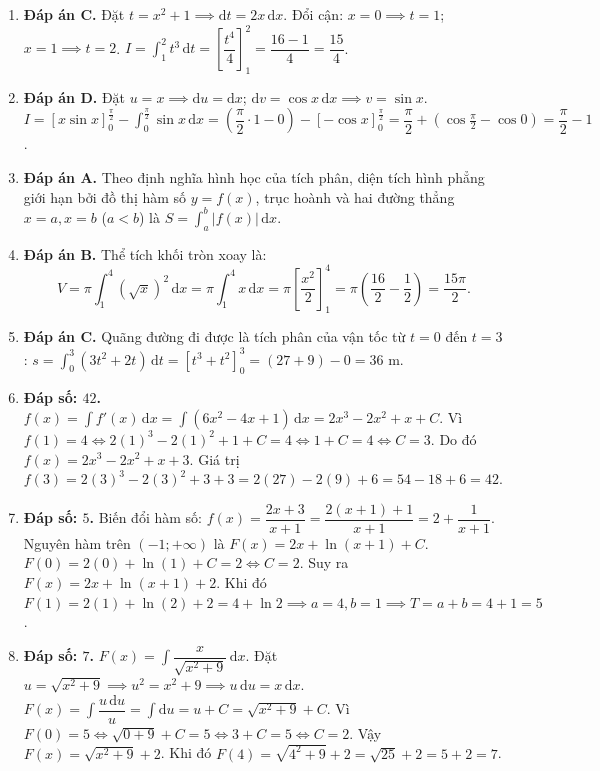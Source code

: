 \documentclass[12pt,a4paper]{article}
\begin{document}
\begin{enumerate}[start=16]
\item \textbf{Đáp án C.}  
Đặt $t = x^2+1 \implies \mathrm{d}t = 2x\,\mathrm{d}x$.  
Đổi cận: $x = 0 \implies t = 1$; $x = 1 \implies t = 2$.  
$I = \int_1^2 t^3\,\mathrm{d}t = \left[ \dfrac{t^4}{4} \right]_1^2 = \dfrac{16 - 1}{4} = \dfrac{15}{4}$.

\item \textbf{Đáp án D.}  
Đặt $u = x \implies \mathrm{d}u = \mathrm{d}x$; $\mathrm{d}v = \cos x\,\mathrm{d}x \implies v = \sin x$.  
$I = [x\sin x]_0^{\frac{\pi}{2}} - \int_0^{\frac{\pi}{2}} \sin x\,\mathrm{d}x = \left(\dfrac{\pi}{2} \cdot 1 - 0\right) - [-\cos x]_0^{\frac{\pi}{2}} = \dfrac{\pi}{2} + (\cos \frac{\pi}{2} - \cos 0) = \dfrac{\pi}{2} - 1$.

\item \textbf{Đáp án A.}  
Theo định nghĩa hình học của tích phân, diện tích hình phẳng giới hạn bởi đồ thị hàm số $y = f(x)$, trục hoành và hai đường thẳng $x = a, x = b$ ($a < b$) là $S = \int_a^b |f(x)|\,\mathrm{d}x$.

\item \textbf{Đáp án B.}  
Thể tích khối tròn xoay là:  
\[
V = \pi \int_1^4 (\sqrt{x})^2\,\mathrm{d}x = \pi \int_1^4 x\,\mathrm{d}x = \pi \left[ \dfrac{x^2}{2} \right]_1^4 = \pi \left(\dfrac{16}{2} - \dfrac{1}{2}\right) = \dfrac{15\pi}{2}.
\]

\item \textbf{Đáp án C.}  
Quãng đường đi được là tích phân của vận tốc từ $t = 0$ đến $t = 3$:  
$s = \int_0^3 (3t^2 + 2t)\,\mathrm{d}t = \left[ t^3 + t^2 \right]_0^3 = (27 + 9) - 0 = 36\text{ m}$.

\item \textbf{Đáp số: $42$.}  
$f(x) = \int f'(x)\,\mathrm{d}x = \int (6x^2 - 4x + 1)\,\mathrm{d}x = 2x^3 - 2x^2 + x + C$.  
Vì $f(1) = 4 \iff 2(1)^3 - 2(1)^2 + 1 + C = 4 \iff 1 + C = 4 \iff C = 3$.  
Do đó $f(x) = 2x^3 - 2x^2 + x + 3$.  
Giá trị $f(3) = 2(3)^3 - 2(3)^2 + 3 + 3 = 2(27) - 2(9) + 6 = 54 - 18 + 6 = 42$.

\item \textbf{Đáp số: $5$.}  
Biến đổi hàm số: $f(x) = \dfrac{2x+3}{x+1} = \dfrac{2(x+1) + 1}{x+1} = 2 + \dfrac{1}{x+1}$.  
Nguyên hàm trên $(-1; +\infty)$ là $F(x) = 2x + \ln(x+1) + C$.  
$F(0) = 2(0) + \ln(1) + C = 2 \iff C = 2$.  
Suy ra $F(x) = 2x + \ln(x+1) + 2$.  
Khi đó $F(1) = 2(1) + \ln(2) + 2 = 4 + \ln 2 \implies a = 4, b = 1 \implies T = a + b = 4 + 1 = 5$.

\item \textbf{Đáp số: $7$.}  
$F(x) = \int \dfrac{x}{\sqrt{x^2+9}}\,\mathrm{d}x$. Đặt $u = \sqrt{x^2+9} \implies u^2 = x^2+9 \implies u\,\mathrm{d}u = x\,\mathrm{d}x$.  
$F(x) = \int \dfrac{u\,\mathrm{d}u}{u} = \int \mathrm{d}u = u + C = \sqrt{x^2+9} + C$.  
Vì $F(0) = 5 \iff \sqrt{0+9} + C = 5 \iff 3 + C = 5 \iff C = 2$.  
Vậy $F(x) = \sqrt{x^2+9} + 2$.  
Khi đó $F(4) = \sqrt{4^2+9} + 2 = \sqrt{25} + 2 = 5 + 2 = 7$.


\end{enumerate}
\end{document}
